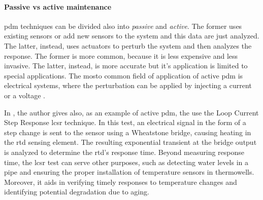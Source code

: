 \paragraph*{Passive vs active maintenance}
\gls{pdm} techniques can be divided also into \emph{passive} and \emph{active}. The former uses existing sensors or add new sensors to the system and this data are just analyzed. The latter, instead, uses actuators to perturb the system and then analyzes the response. The former is more common, because it is less expensive and less invasive. The latter, instead, is more accurate but it's application is limited to special applications. The mosto common field of application of active \gls{pdm} is electrical systems, where the perturbation can be applied by injecting a current or a voltage \cite{State_Art_Hasemian_2011}.

In \cite{State_Art_Hasemian_2011}, the author gives also, as an example of active \gls{pdm}, the use the Loop Current Step Response \gls{lcsr} technique. In this test, an electrical signal in the form of a step change is sent to the sensor using a Wheatstone bridge, causing heating in the \gls{rtd} sensing element. The resulting exponential transient at the bridge output is analyzed to determine the \gls{rtd}'s response time. Beyond measuring response time, the \gls{lcsr} test can serve other purposes, such as detecting water levels in a pipe and ensuring the proper installation of temperature sensors in thermowells. Moreover, it aids in verifying timely responses to temperature changes and identifying potential degradation due to aging.